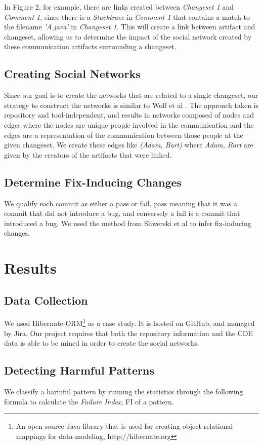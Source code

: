 \documentclass[conference]{IEEEtran}
\begin{document}
In Figure 2, for example, there are links created between \emph{Changeset 1} and \emph{Comment 1}, since there is a \emph{Stacktrace} in \emph{Comment 1} that contains a match to the filename \emph{'A.java'} in \emph{Changeset 1}.  This will create a link between artifact and changeset, allowing us to determine the impact of the social network created by these communication artifacts surrounding a changeset.

\subsection{Creating Social Networks} 
Since our goal is to create the networks that are related to a single changeset, our strategy to construct the networks is similar to Wolf et al \cite{4721184}.  The approach taken is repository and tool-independent, and results in networks composed of nodes and edges where the nodes are unique people involved in the communication and the edges are a representation of the communication between those people at the given changeset.  We create these edges like \emph{(Adam, Bart)} where \emph{Adam, Bart} are given by the creators of the artifacts that were linked.   

\subsection{Determine Fix-Inducing Changes}
We qualify each commit as either a pass or fail, pass meaning that it was a commit that did not introduce a bug, and conversely a fail is a commit that introduced a bug.  We used the method from Sliwerski et al \cite{Sliwerski:2005:CIF:1083142.1083147} to infer fix-inducing changes. 

\section{Results}
\subsection{Data Collection}
We used Hibernate-ORM\footnote{An open source Java library that is used for creating object-relational mappings for data-modeling, http://hibernate.org} as a case study.  It is hosted on GitHub, and managed by Jira\footnotemark[2].  Our project requires that both the repository information and the CDE data is able to be mined in order to create the social networks.

\subsection{Detecting Harmful Patterns} 
We classify a harmful pattern by running the statistics through the following formula to calculate the \emph{Failure Index}, FI of a pattern.
\end{document}
